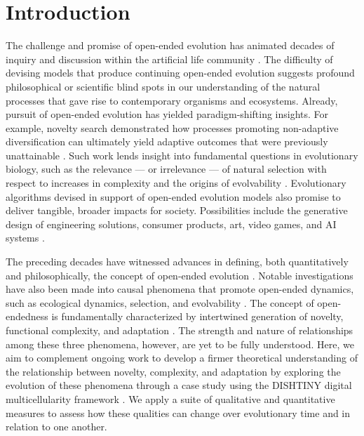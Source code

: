 

\section{Introduction}

The challenge and promise of open-ended evolution has animated decades of inquiry and discussion within the artificial life community \citep{packard2019overview}.
The difficulty of devising models that produce continuing open-ended evolution suggests profound philosophical or scientific blind spots in our understanding of the natural processes that gave rise to contemporary organisms and ecosystems.
Already, pursuit of open-ended evolution has yielded paradigm-shifting insights.
For example, novelty search demonstrated how processes promoting non-adaptive diversification can ultimately yield adaptive outcomes that were previously unattainable \citep{lehman2011abandoning}.
Such work lends insight into fundamental questions in evolutionary biology, such as the relevance --- or irrelevance --- of natural selection with respect to increases in complexity \citep{lehman2012evolution, Lynch8597} and the origins of evolvability \citep{lehman2013evolvability,Kirschner8420}.
Evolutionary algorithms devised in support of open-ended evolution models also promise to deliver tangible, broader impacts for society.
Possibilities include the generative design of engineering solutions, consumer products, art, video games, and AI systems \citep{nguyen2015,stanley2019open}.

The preceding decades have witnessed advances in defining, both quantitatively and philosophically, the concept of open-ended evolution \citep{lehman2012beyond,dolson2019modes,bedau1998classification}.
Notable investigations have also been made into causal phenomena that promote open-ended dynamics, such as ecological dynamics, selection, and evolvability \citep{dolson2019constructive,soros2014identifying,huizinga2018emergence}.
The concept of open-endedness is fundamentally characterized by intertwined generation of novelty, functional complexity, and adaptation \citep{taylor2016open}.
The strength and nature of relationships among these three phenomena, however, are yet to be fully understood.
Here, we aim to complement ongoing work to develop a firmer theoretical understanding of the relationship between novelty, complexity, and adaptation by exploring the evolution of these phenomena through a case study using the DISHTINY digital multicellularity framework .
We apply a suite of qualitative and quantitative measures to assess how these qualities can change over evolutionary time and in relation to one another.
